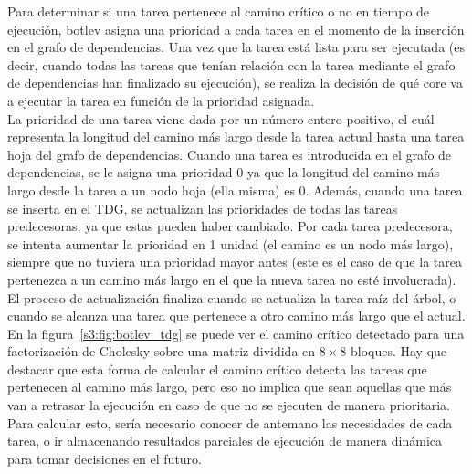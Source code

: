 Para determinar si una tarea pertenece al camino crítico o no en tiempo de
ejecución, botlev asigna una prioridad a cada tarea en el momento de la
inserción en el grafo de dependencias. Una vez que la tarea está lista para
ser ejecutada (es decir, cuando todas las tareas que tenían relación con la
tarea mediante el grafo de dependencias han finalizado su ejecución), se
realiza la decisión de qué core va a ejecutar la tarea en función de la
prioridad
asignada.\\
La prioridad de una tarea viene dada por un número entero positivo, el cuál
representa la longitud del camino más largo desde la tarea actual hasta una
tarea hoja del grafo de dependencias. Cuando una tarea es introducida en el
grafo de dependencias, se le asigna una prioridad 0 ya que la longitud del
camino más largo desde la tarea a un nodo hoja (ella misma) es 0. Además,
cuando una tarea se inserta en el TDG, se actualizan las prioridades de
todas las tareas predecesoras, ya que estas pueden haber cambiado. Por cada
tarea predecesora, se intenta aumentar la prioridad en 1 unidad (el camino
es un nodo más largo), siempre que no tuviera una prioridad mayor antes
(este es el caso de que la tarea pertenezca a un camino más largo en el que
la nueva tarea no esté involucrada). El proceso de actualización finaliza
cuando se actualiza la tarea raíz del árbol, o cuando se alcanza una tarea
que pertenece a otro camino más largo que el actual. En la
figura~\ref{s3:fig:botlev_tdg} se puede ver el camino crítico detectado
para una factorización de Cholesky sobre una matriz dividida en $8\times8$
bloques. Hay que destacar que esta forma de calcular el camino crítico
detecta las tareas que pertenecen al camino más largo, pero eso no implica
que sean aquellas que más van a retrasar la ejecución en caso de que no se
ejecuten de manera prioritaria. Para calcular esto, sería necesario conocer
de antemano las necesidades de cada tarea, o ir almacenando resultados
parciales de ejecución de manera dinámica para tomar decisiones en el
futuro.
